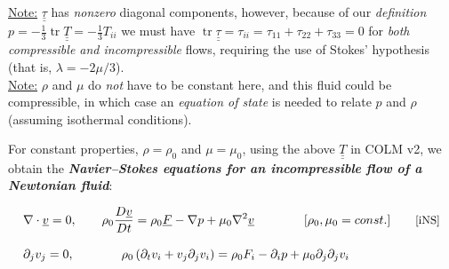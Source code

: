 \documentclass[12pt,landscape]{article}
\DeclareMathOperator{\tr}{tr}
\begin{document}
\\
\underline{Note:} $\underline{\underline{\tau}}$ has \emph{nonzero} diagonal components, however, because of our \emph{definition} $p = -\frac{1}{3}\tr \underline{\underline{T}} = -\frac{1}{3}T_{ii}$ we must have $\tr\underline{\underline{\tau}} = \tau_{ii} = \tau_{11}+\tau_{22}+\tau_{33} = 0$
for \emph{both compressible and incompressible} flows, requiring the use of Stokes' hypothesis (that is, $\lambda = -2\mu/3$).
\\
\underline{Note:} $\rho$ and $\mu$ do \emph{not} have to be constant here, and this fluid could be compressible, in which case an \emph{equation of state} is needed to relate $p$ and $\rho$ (assuming isothermal conditions).


\vfill

For constant properties, $\rho=\rho_0$ and $\mu=\mu_0$, using the above $\underline{\underline{T}}$ in COLM v2, we obtain the \textbf{\emph{Navier--Stokes equations for an {incompressible flow of a Newtonian} fluid}}:
\begin{empheqboxed}
\begin{align}
    &\nabla\cdot\underline{v} = 0,\qquad \rho_0 \frac{D \underline{v}}{D t} = \rho_0 \underline{F} -\nabla p + \mu_0 \nabla^2\underline{v}\qquad\qquad [\rho_0,\mu_0=const.] \tag*{\text{\small[iNS]}}\\[3mm]
    &\partial_j v_j = 0, \hspace{38pt} \rho_0 \left(\partial_t v_i + v_j  \partial_j v_i \right) = \rho_0 F_i - \partial_i p + \mu_0 \partial_j \partial_j v_i \nonumber
\end{align}
\end{empheqboxed}
\end{document}
